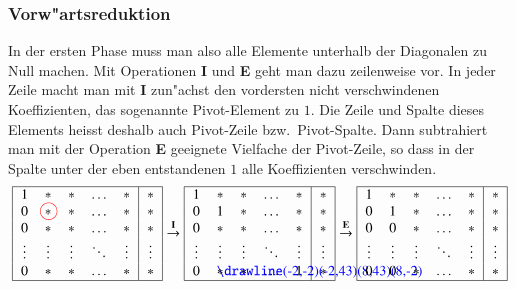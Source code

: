 \subsubsection{Vorw"artsreduktion}
In der ersten Phase muss man also alle Elemente unterhalb der
Diagonalen zu Null machen.
Mit Operationen {\bf I} und {\bf E} geht man dazu zeilenweise vor.
In jeder Zeile macht man mit {\bf I}
zun"achst den vordersten nicht verschwindenen Koeffizienten, das sogenannte
Pivot-Element zu $1$.
Die Zeile und Spalte dieses Elements heisst deshalb
auch Pivot-Zeile bzw.~Pivot-Spalte.
Dann subtrahiert man mit der Operation {\bf E} geeignete Vielfache
der Pivot-Zeile, so dass in der Spalte
unter der eben entstandenen $1$ alle Koeffizienten verschwinden.
\begin{gather*}
\begin{tabular}{|>{$}c<{$}>{$}c<{$}>{$}c<{$}>{$}c<{$}>{$}c<{$}|>{$}c<{$}|}
\hline
1&*&*&\dots&*&*\\
0&\begin{picture}(0,0)
\color{red}\put(2.8,3.05){\circle{12}}
\end{picture}%
*&*&\dots&*&*\\
0&*&*&\dots&*&*\\
\vdots&\vdots& \vdots& \ddots& \vdots&\vdots\\
0&*&*&\dots&*&*\\
\hline
\end{tabular}
\overset{\text{\bf I}}\rightarrow
\begin{tabular}{|>{$}c<{$}>{$}c<{$}>{$}c<{$}>{$}c<{$}>{$}c<{$}|>{$}c<{$}|}
\hline
1&*&*&\dots&*&*\\
0&1&*&\dots&*&*\\
0&*&*&\dots&*&*\\
\vdots&\vdots& \vdots& \ddots& \vdots&\vdots\\
0&\begin{picture}(0,0)
\color{blue}\drawline(-2,-2)(-2,43)(8,43)(8,-2)
\end{picture}%
*&*&\dots&1&*\\
\hline
\end{tabular}
\overset{\text{\bf E}}\rightarrow
\begin{tabular}{|>{$}c<{$}>{$}c<{$}>{$}c<{$}>{$}c<{$}>{$}c<{$}|>{$}c<{$}|}
\hline
1&*&*&\dots&*&*\\
0&1&*&\dots&*&*\\
0&0&*&\dots&*&*\\
\vdots& \vdots&\vdots& \ddots& \vdots&\vdots\\
0&0&*&\dots&*&*\\
\hline
\end{tabular}
\end{gather*}

